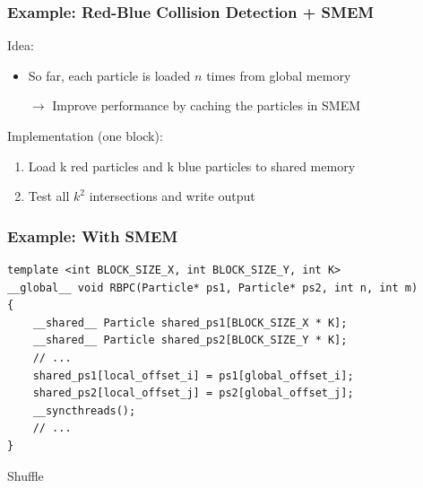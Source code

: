 \documentclass[aspectratio=169,handout]{beamer}
\begin{document}
\begin{frame}[fragile]
\frametitle{Example: Red-Blue Collision Detection + SMEM}
Idea:
\begin{itemize}
	\item So far, each particle is loaded $n$ times from global memory
	\item[$\rightarrow$] Improve performance by caching the particles in SMEM
\end{itemize}
Implementation (one block):
\begin{enumerate}
	\item Load k red particles and k blue particles to shared memory
	\item Test all $k^2$ intersections and write output
\end{enumerate}
\end{frame}



\begin{frame}[fragile]
\frametitle{Example: With SMEM}
\begin{lstlisting}
template <int BLOCK_SIZE_X, int BLOCK_SIZE_Y, int K>
__global__ void RBPC(Particle* ps1, Particle* ps2, int n, int m)
{
    __shared__ Particle shared_ps1[BLOCK_SIZE_X * K];
    __shared__ Particle shared_ps2[BLOCK_SIZE_Y * K];
    // ...
    shared_ps1[local_offset_i] = ps1[global_offset_i];
    shared_ps2[local_offset_j] = ps2[global_offset_j];
    __syncthreads();
    // ...
}
\end{lstlisting}
\end{frame}




\begin{frame}[fragile]
\begin{center}
\Large Shuffle
\end{center}
\end{frame}
\end{document}
